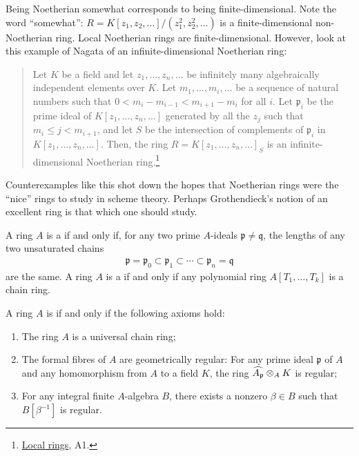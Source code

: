 \documentclass [11 pt, oneside] {article}
\begin{document}
\begin{remark}
	Being Noetherian somewhat corresponds to being finite-dimensional. Note the word ``somewhat'': $R = K[z_1,z_2,\hdots]/(z_1^2,z_2^2,\hdots)$ is a finite-dimensional non-Noetherian ring. Local Noetherian rings are finite-dimensional. However, look at this example of Nagata of an infinite-dimensional Noetherian ring:
\begin{quote}
\small
Let $K$ be a field and let $z_1,\hdots, z_n,\hdots$ be infinitely many algebraically independent elements over $K$. Let $m_1,\hdots, m_i,\hdots$ be a sequence of natural numbers such that $0<m_i-m_{i-1} < m_{i+1}-m_i$ for all $i$. Let $\mathfrak{p}_i$ be the prime ideal of $K[z_1,\hdots, z_n,\hdots]$ generated by all the $z_j$ such that $m_i\le j<m_{i+1}$, and let $S$ be the intersection of complements of $\mathfrak{p}_i$ in $K[z_1,\hdots, z_n,\hdots]$. Then, the ring $R = K[z_1,\hdots, z_n,\hdots]_S$ is an infinite-dimensional Noetherian ring.\footnote{\ul{Local rings}, A1.}
\end{quote}

	Counterexamples like this shot down the hopes that Noetherian rings were the ``nice'' rings to study in scheme theory. Perhaps Grothendieck's notion of an excellent ring is that which one should study.
\end{remark}

\begin{definition}[ ]\label{}\text{}
A ring $A$ is a  if and only if, for any two prime $A$-ideals $\mathfrak{p}\ne \mathfrak{q}$, the lengths of any two unsaturated chains 
\begin{align*}
	\mathfrak{p} = \mathfrak{p}_0 \subset \mathfrak{p}_1\subset\cdots\subset \mathfrak{p}_n=\mathfrak{q}
\end{align*}
are the same. A ring $A$ is a  if and only if any polynomial ring $A[T_1,\hdots, T_k]$ is a chain ring.
\end{definition}


\begin{definition}[ ]\label{}\text{}
A ring $A$ is  if and only if the following axioms hold:
\begin{enumerate}
	\item The ring $A$ is a universal chain ring;
	\item The formal fibres of $A$ are geometrically regular: For any prime ideal $\mathfrak{p}$ of $A$ and any homomorphism from $A$ to a field $K$, the ring $\widehat{A_{\mathfrak{p}}}\otimes_A K$ is regular;
	\item For any integral finite $A$-algebra $B$, there exists a nonzero $\beta\in B$ such that $B[\beta^{-1}]$ is regular.
\end{enumerate}
\end{definition}
\end{document}
